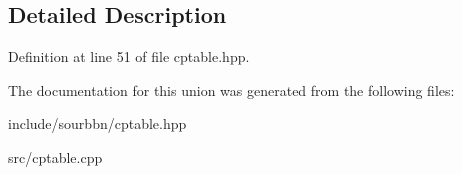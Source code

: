 \subsection{Detailed Description}


Definition at line 51 of file cptable.\+hpp.



The documentation for this union was generated from the following files\+:\begin{DoxyCompactItemize}
\item 
include/sourbbn/cptable.\+hpp\item 
src/cptable.\+cpp\end{DoxyCompactItemize}
